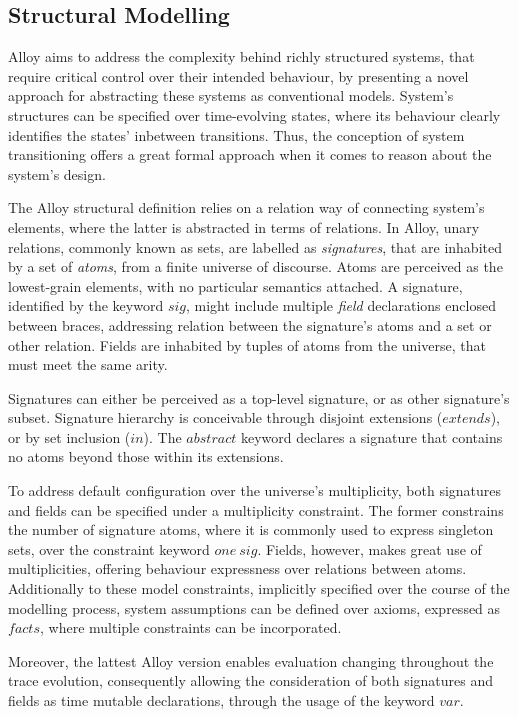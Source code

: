 \subsection{Structural Modelling}\label{c:alloy-sm}

Alloy aims to address the complexity behind richly structured systems, that require critical control over their intended behaviour, by presenting a novel approach for abstracting these systems as conventional models. System's structures can be specified over time-evolving states, where its behaviour clearly identifies the states' inbetween transitions. Thus, the conception of system transitioning offers a great formal approach when it comes to reason about the system's design.

The Alloy structural definition relies on a relation way of connecting system's elements, where the latter is abstracted in terms of relations. In Alloy, unary relations, commonly known as sets, are labelled as \textit{signatures}, that are inhabited by a set of \textit{atoms}, from a finite universe of discourse. Atoms are perceived as the lowest-grain elements, with no particular semantics attached. A signature, identified by the keyword $sig$, might include multiple \textit{field} declarations enclosed between braces, addressing relation between the signature's atoms and a set or other relation. Fields are inhabited by tuples of atoms from the universe, that must meet the same arity.

Signatures can either be perceived as a top-level signature, or as other signature's subset. Signature hierarchy is conceivable through disjoint extensions ($extends$), or by set inclusion ($in$). The $abstract$ keyword declares a signature that contains no atoms beyond those within its extensions. 

To address default configuration over the universe's multiplicity, both signatures and fields can be specified under a multiplicity constraint. The former constrains the number of signature atoms, where it is commonly used to express singleton sets, over the constraint keyword $one\ sig$. Fields, however, makes great use of multiplicities, offering behaviour expressness over relations between atoms. Additionally to these model constraints, implicitly specified over the course of the modelling process, system assumptions can be defined over axioms, expressed as $facts$, where multiple constraints can be incorporated.

Moreover, the lattest Alloy version enables evaluation changing throughout the trace evolution, consequently allowing the consideration of both signatures and fields as time mutable declarations, through the usage of the keyword $var$.

